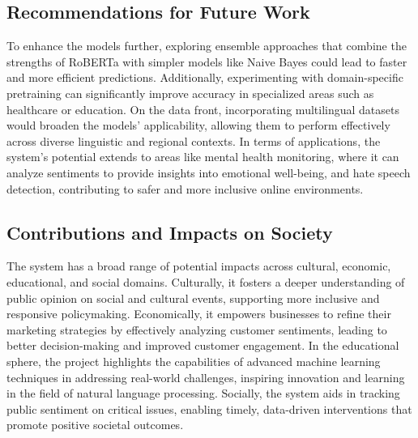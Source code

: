 \documentclass[journal]{IEEEtran}
\begin{document}
\subsection{\textbf{Recommendations for Future Work}}
To enhance the models further, exploring ensemble approaches that combine the strengths of RoBERTa with simpler models like Naive Bayes could lead to faster and more efficient predictions. Additionally, experimenting with domain-specific pretraining can significantly improve accuracy in specialized areas such as healthcare or education. On the data front, incorporating multilingual datasets would broaden the models' applicability, allowing them to perform effectively across diverse linguistic and regional contexts. In terms of applications, the system's potential extends to areas like mental health monitoring, where it can analyze sentiments to provide insights into emotional well-being, and hate speech detection, contributing to safer and more inclusive online environments.
\subsection{\textbf{Contributions and Impacts on Society}}
The system has a broad range of potential impacts across cultural, economic, educational, and social domains. Culturally, it fosters a deeper understanding of public opinion on social and cultural events, supporting more inclusive and responsive policymaking. Economically, it empowers businesses to refine their marketing strategies by effectively analyzing customer sentiments, leading to better decision-making and improved customer engagement. In the educational sphere, the project highlights the capabilities of advanced machine learning techniques in addressing real-world challenges, inspiring innovation and learning in the field of natural language processing. Socially, the system aids in tracking public sentiment on critical issues, enabling timely, data-driven interventions that promote positive societal outcomes.
\end{document}
